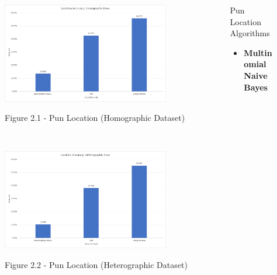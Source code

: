 \documentclass[final]{beamer}
\newlength{\onecolwid}
\newlength{\twocolwid}
\begin{document}
\begin{frame}[t]
\begin{columns}[t]
\begin{column}{\twocolwid}
\begin{columns}[t,totalwidth=\twocolwid]
\begin{column}{\onecolwid}
					\begin{figure}
					\includegraphics[width=0.85\textwidth]{HomographicLocation.png}\\
					\caption{Figure 2.1 - Pun Location (Homographic Dataset)}
					\end{figure}
					\\
					\vspace{20mm}
					\begin{figure}
					\includegraphics[width=0.85\textwidth]{HeterographicLocation.png}\\
					\caption{Figure 2.2 - Pun Location (Heterographic Dataset)}
					\end{figure}
				\end{column}
				\begin{column}{\onecolwid}
					\vspace{40mm}
					\begin{block}{Pun Location Algorithms}
						{\large 
							\begin{itemize}
								\item {\textbf{Multinomial Naive Bayes}\\
}
\end{itemize}}
\end{block}
\end{column}
\end{columns}
\end{column}
\end{columns}
\end{frame}
\end{document}
